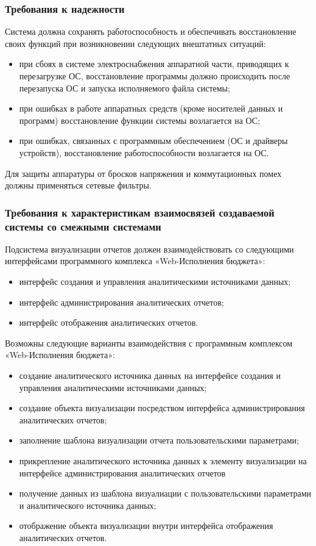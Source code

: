 \documentclass[a4paper]{extarticle}
\begin{document}
\subsubsection{Требования к надежности}
Система должна сохранять работоспособность и обеспечивать восстановление своих функций при возникновении следующих внештатных ситуаций:\par
\begin{itemize}
	\item при сбоях в системе электроснабжения аппаратной части, приводящих к перезагрузке ОС, восстановление программы должно происходить после перезапуска ОС и запуска исполняемого файла системы;
	\item при ошибках в работе аппаратных средств (кроме носителей данных и программ) восстановление функции системы возлагается на ОС;
	\item при ошибках, связанных с программным обеспечением (ОС и драйверы устройств), восстановление работоспособности возлагается на ОС.\par
\end{itemize}\par
Для защиты аппаратуры от бросков напряжения и коммутационных помех должны применяться сетевые фильтры.

\subsubsection{Требования к характеристикам взаимосвязей создаваемой системы со смежными системами}
Подсистема визуализации отчетов должен взаимодействовать со следующими интерфейсами программного комплекса «Web-Исполнения бюджета»:\par
\begin{itemize}
  \item интерфейс создания и управления аналитическими источниками данных;
  \item интерфейс администрирования аналитических отчетов;
  \item интерфейс отображения аналитических отчетов.
\end{itemize}\par
Возможны следующие варианты взаимодействия с программным комплексом «Web-Исполнения бюджета»:
\begin{itemize}
  \item создание аналитического источника данных на интерфейсе создания и управления аналитическими источниками данных;
  \item создание объекта визуализации посредством интерфейса администрирования аналитических отчетов;
  \item заполнение шаблона визуализации отчета пользовательскими параметрами;
  \item прикрепление аналитического источника данных к элементу визуализации на интерфейсе администрирования аналитических отчетов
  \item получение данных из шаблона визуалиации с пользовательскими параметрами и аналитического источника данных;
  \item отображение объекта визуализации внутри интерфейса отображения аналитических отчетов.
\end{itemize}
\end{document}
